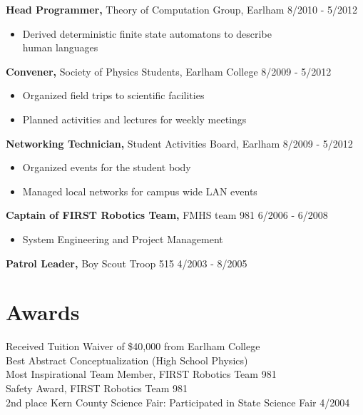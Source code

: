 \documentclass[margin]{res}
\begin{document}
\begin{resume}
{\bf Head Programmer,} Theory of Computation Group, Earlham   \hfill 8/2010 - 5/2012
\begin{itemize} \itemsep -2pt
\item Derived deterministic finite state automatons to describe\\ human languages 
\end{itemize}
\vspace*{-4mm}
{\bf Convener,} Society of Physics Students, Earlham College \hfill 8/2009 - 5/2012 
\begin{itemize} \itemsep -2pt
\item Organized field trips to scientific facilities
\item Planned activities and lectures for weekly meetings 
\end{itemize}
\vspace*{-4mm}
{\bf Networking Technician,} Student Activities Board, Earlham \hfill 8/2009 - 5/2012 
\begin{itemize} \itemsep -2pt
\item Organized events for the student body 
\item Managed local networks for campus wide LAN events 
\end{itemize}
\vspace*{-4mm}
{\bf Captain of FIRST Robotics Team,} FMHS team 981 \hfill
6/2006 - 6/2008      
\begin{itemize} \itemsep -2pt
\item System Engineering and Project Management 
\end{itemize}
\vspace*{-4mm}
{\bf  Patrol Leader,}  Boy Scout Troop 515    \hfill 4/2003 - 8/2005 


\vspace*{-1mm}
\section{Awards} 
Received Tuition Waiver of {\$}40,000 from Earlham College\\
Best Abstract Conceptualization (High School Physics) \\
Most Inspirational Team Member, FIRST Robotics Team 981 \\
Safety Award, FIRST Robotics Team 981 \\
2nd place Kern County Science Fair: Participated in State Science Fair 4/2004
 

\end{resume}
\end{document}
